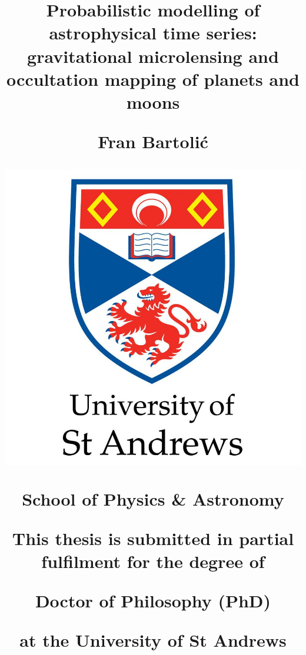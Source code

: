 \documentclass[12pt,dvipsnames]{report}
\begin{document}
\title{
        \begin{center}
        \LARGE\textbf{Probabilistic modelling of astrophysical time series:
            gravitational microlensing and occultation mapping of planets and moons}
    \end{center}
    \vspace{15pt}
    \begin{center}
        Fran Bartoli\'{c}
    \end{center}
    \vspace{15pt}
\begin{center}\includegraphics[width=0.4\linewidth]{../static/misc/logo.jpg}\end{center}
    \vspace{10pt}
    \begin{center}
        School of Physics \& Astronomy
    \end{center}
   \vspace{20pt}
    \begin{center}\large This thesis is submitted in partial fulfilment for the degree of \end{center}
    \begin{center}\large Doctor of Philosophy (PhD)\end{center}
    \begin{center}\large at the University of St Andrews \end{center}
}

\maketitle
\end{document}
